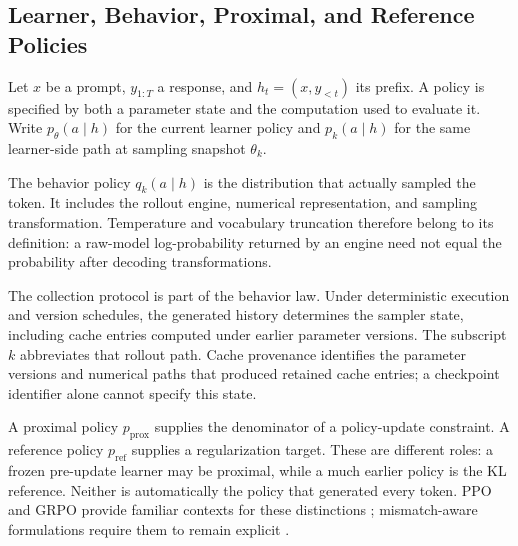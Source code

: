 \subsection{Learner, Behavior, Proximal, and Reference Policies}
Let $x$ be a prompt, $y_{1:T}$ a response, and $h_t=(x,y_{<t})$ its prefix. A policy is specified by both a parameter state and the computation used to evaluate it. Write $p_\theta(a\mid h)$ for the current learner policy and $p_k(a\mid h)$ for the same learner-side path at sampling snapshot $\theta_k$.

The behavior policy $q_k(a\mid h)$ is the distribution that actually sampled the token. It includes the rollout engine, numerical representation, and sampling transformation. Temperature and vocabulary truncation therefore belong to its definition: a raw-model log-probability returned by an engine need not equal the probability after decoding transformations.

The collection protocol is part of the behavior law. Under deterministic execution and version schedules, the generated history determines the sampler state, including cache entries computed under earlier parameter versions. The subscript $k$ abbreviates that rollout path. Cache provenance identifies the parameter versions and numerical paths that produced retained cache entries; a checkpoint identifier alone cannot specify this state.

A proximal policy $p_{\mathrm{prox}}$ supplies the denominator of a policy-update constraint. A reference policy $p_{\mathrm{ref}}$ supplies a regularization target. These are different roles: a frozen pre-update learner may be proximal, while a much earlier policy is the KL reference. Neither is automatically the policy that generated every token. PPO and GRPO provide familiar contexts for these distinctions \citep{ppo,grpo}; mismatch-aware formulations require them to remain explicit \citep{flashrl,minirl}.

